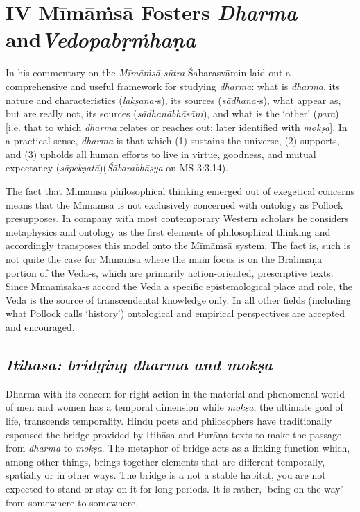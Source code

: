 \section*{IV Mīmāṁsā Fosters \textit{Dharma} and\hfill \break \textit{Vedopabṛṁhaṇa}}

In his commentary on the \textit{Mīmāṁsā sūtra} Śabarasvāmin laid out a comprehensive and useful framework for studying \textit{dharma}: what is \textit{dharma}, its nature and characteristics (\textit{lakṣaṇa-}s), its sources (\textit{sādhana-}s), what appear as, but are really not, its sources (\textit{sādhanābhāsāni}), and what is the ‘other’ (\textit{para}) [i.e. that to which \textit{dharma} relates or reaches out; later identified with \textit{mokṣa}]. In a practical sense, \textit{dharma} is that which (1) sustains the universe, (2) supports, and (3) upholds all human efforts to live in virtue, goodness, and mutual expectancy (\textit{sāpekṣatā})(\textit{Śābarabhāṣya} on MS 3:3.14).

The fact that Mīmāṁsā philosophical thinking emerged out of exegetical concerns means that the Mīmāṁsā is not exclusively concerned with ontology as Pollock presupposes. In company with most contemporary Western scholars he considers metaphysics and ontology as the first elements of philosophical thinking and accordingly transposes this model onto the Mīmāṁsā system. The fact is, such is not quite the case for Mīmāṁsā where the main focus is on the Brāhmaṇa portion of the Veda-s, which are primarily action-oriented, prescriptive texts. Since Mīmāṁsaka-s accord the Veda a specific epistemological place and role, the Veda is the source of transcendental knowledge only. In all other fields (including what Pollock calls ‘history’) ontological and empirical perspectives are accepted and encouraged.

\subsection*{\textit{Itihāsa: bridging dharma and mokṣa}}

Dharma with its concern for right action in the material and phenomenal world of men and women has a temporal dimension while \textit{mokṣa}, the ultimate goal of life, transcends temporality. Hindu poets and philosophers have traditionally espoused the bridge provided by Itihāsa and Purāṇa texts to make the passage from \textit{dharma} to \textit{mokṣa}. The metaphor of bridge acts as a linking function which, among other things, brings together elements that are different temporally, spatially or in other ways. The bridge is a not a stable habitat, you are not expected to stand or stay on it for long periods. It is rather, ‘being on the way’ from somewhere to somewhere.

